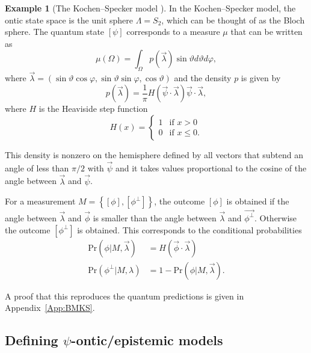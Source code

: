 \documentclass[DIV=calc,fontsize=12pt]{scrartcl} %
\theoremstyle{definition}
\newtheorem{example}[definition]{Example}
\theoremstyle{plain}
\newcommand{\Proj}[1]{\ensuremath{\left [ #1 \right ]}}
\begin{document}
\begin{example}[The Kochen--Specker model \cite{Kochen1967}]
In the Kochen--Specker model, the ontic state space is the unit
sphere $\Lambda = S_2$, which can be thought of as the Bloch sphere.
The quantum state $\Proj{\psi}$ corresponds to a measure $\mu$ that
can be written as
\begin{equation}
\mu(\Omega) = \int_{\Omega} p(\vec{\lambda}) \sin \vartheta d
\vartheta d \varphi,
\end{equation}
where $\vec{\lambda} = (\sin \vartheta \cos \varphi, \sin \vartheta
\sin \varphi, \cos \vartheta)$ and the density $p$ is given by
\begin{equation}
p(\vec{\lambda}) = \frac{1}{\pi} H(\vec{\psi} \cdot
\vec{\lambda}) \vec{\psi} \cdot \vec{\lambda},
\end{equation}
where $H$ is the Heaviside step function
\begin{equation}
H(x) = \begin{cases}1 & \text{if} \,\, x>0 \\ 0 & \text{if}
\,\, x\leq 0. \end{cases}
\end{equation}

This density is nonzero on the hemisphere defined by all vectors
that subtend an angle of less than $\pi/2$ with $\vec{\psi}$ and it
takes values proportional to the cosine of the angle between
$\vec{\lambda}$ and $\vec{\psi}$.

For a measurement $M = \left \{\Proj{\phi},\Proj{\phi^{\perp}}\right
\}$, the outcome $\Proj{\phi}$ is obtained if the angle between
$\vec{\lambda}$ and $\vec{\phi}$ is smaller than the angle between
$\vec{\lambda}$ and $\vec{\phi^{\perp}}$.  Otherwise the outcome
$\Proj{\phi^{\perp}}$ is obtained.  This corresponds to the
conditional probabilities
\begin{align}
\text{Pr}(\phi|M,\vec{\lambda}) & = H (\vec{\phi} \cdot
\vec{\lambda}) \\
\text{Pr}(\phi^{\perp}|M,\lambda) & = 1 -
\text{Pr}(\phi|M,\vec{\lambda}).
\end{align}

A proof that this reproduces the quantum predictions is given in
Appendix~\ref{App:BMKS}.
\end{example}

\subsection{Defining $\psi$-ontic/epistemic models}

\label{POEM}
\end{document}
